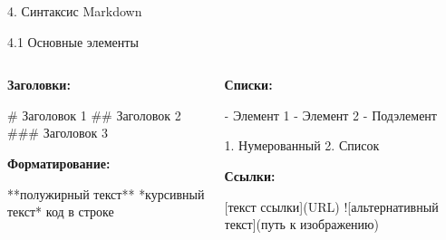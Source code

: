 \documentclass[
  ignorenonframetext,
  aspectratio=169,
]{beamer}
\newenvironment{Shaded}{\begin{snugshade}}{\end{snugshade}}
\newcommand{\AlertTok}[1]{\textcolor[rgb]{0.68,0.00,0.00}{#1}}
\newcommand{\CommentTok}[1]{\textcolor[rgb]{0.37,0.37,0.37}{#1}}
\newcommand{\FunctionTok}[1]{\textcolor[rgb]{0.28,0.35,0.67}{#1}}
\newcommand{\InformationTok}[1]{\textcolor[rgb]{0.37,0.37,0.37}{#1}}
\newcommand{\NormalTok}[1]{\textcolor[rgb]{0.00,0.23,0.31}{#1}}
\newcommand{\OtherTok}[1]{\textcolor[rgb]{0.00,0.23,0.31}{#1}}
\newcommand{\SpecialStringTok}[1]{\textcolor[rgb]{0.13,0.47,0.30}{#1}}
\begin{document}
\begin{frame}[fragile]{4. Синтаксис Markdown}
\label{ux441ux438ux43dux442ux430ux43aux441ux438ux441-markdown}
\begin{block}{4.1 Основные элементы}
\label{ux43eux441ux43dux43eux432ux43dux44bux435-ux44dux43bux435ux43cux435ux43dux442ux44b}
\begin{columns}[c]
\begin{column}{0.5\textwidth}
\textbf{Заголовки:}

\begin{Shaded}
\begin{Highlighting}[]
\FunctionTok{\# Заголовок 1}
\FunctionTok{\#\# Заголовок 2}
\FunctionTok{\#\#\# Заголовок 3}
\end{Highlighting}
\end{Shaded}

\textbf{Форматирование:}

\begin{Shaded}
\begin{Highlighting}[]
\NormalTok{**полужирный текст**}
\NormalTok{*курсивный текст*}
\InformationTok{\textasciigrave{}код в строке\textasciigrave{}}
\end{Highlighting}
\end{Shaded}
\end{column}

\begin{column}{0.5\textwidth}
\textbf{Списки:}

\begin{Shaded}
\begin{Highlighting}[]
\SpecialStringTok{{-} }\NormalTok{Элемент 1}
\SpecialStringTok{{-} }\NormalTok{Элемент 2}
\SpecialStringTok{  {-} }\NormalTok{Подэлемент}

\SpecialStringTok{1. }\NormalTok{Нумерованный}
\SpecialStringTok{2. }\NormalTok{Список}
\end{Highlighting}
\end{Shaded}

\textbf{Ссылки:}

\begin{Shaded}
\begin{Highlighting}[]
\CommentTok{[}\OtherTok{текст ссылки}\CommentTok{](URL)}
\AlertTok{![альтернативный текст](путь к изображению)}
\end{Highlighting}
\end{Shaded}
\end{column}
\end{columns}
\end{block}


\end{frame}
\end{document}
